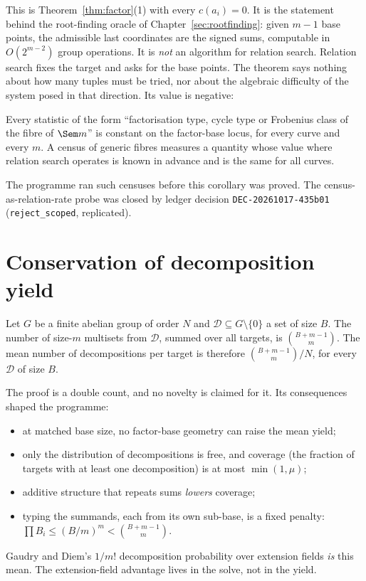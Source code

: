 This is Theorem~\ref{thm:factor}(1) with every $c(a_i)=0$. It is the
statement behind the root-finding oracle of Chapter~\ref{sec:rootfinding}:
given $m-1$ base points, the admissible last coordinates are the signed
sums, computable in $O(2^{m-2})$ group operations. It is \emph{not} an
algorithm for relation search. Relation search fixes the target and asks
for the base points. The theorem says nothing about how many tuples must
be tried, nor about the algebraic difficulty of the system posed in that
direction. Its value is negative:

\begin{corollary}\label{cor:census}
Every statistic of the form ``factorisation type, cycle type or Frobenius
class of the fibre of $\Sem m$'' is constant on the factor-base locus, for
every curve and every $m$. A census of generic fibres measures a quantity
whose value where relation search operates is known in advance and is the
same for all curves.
\end{corollary}

The programme ran such censuses before this corollary was proved. The
census-as-relation-rate probe was closed by ledger decision
\texttt{DEC-20261017-435b01} (\texttt{reject\_scoped}, replicated).

\section{Conservation of decomposition yield}

\begin{proposition}[Conservation]\label{prop:conservation}
Let $G$ be a finite abelian group of order $N$ and
$\mathcal D\subseteq G\setminus\{0\}$ a set of size $B$. The number of
size-$m$ multisets from $\mathcal D$, summed over all targets, is
$\binom{B+m-1}{m}$. The mean number of decompositions per target is
therefore $\binom{B+m-1}{m}/N$, for every $\mathcal D$ of size $B$.
\end{proposition}

The proof is a double count, and no novelty is claimed for it. Its
consequences shaped the programme:
\begin{itemize}
\item at matched base size, no factor-base geometry can raise the mean
  yield;
\item only the distribution of decompositions is free, and coverage
  (the fraction of targets with at least one decomposition) is at most
  $\min(1,\mu)$;
\item additive structure that repeats sums \emph{lowers} coverage;
\item typing the summands, each from its own sub-base, is a fixed penalty:
  $\prod B_i\le(B/m)^m<\binom{B+m-1}{m}$.
\end{itemize}
Gaudry and Diem's $1/m!$ decomposition probability over extension fields
\emph{is} this mean. The extension-field advantage lives in the solve, not
in the yield.

